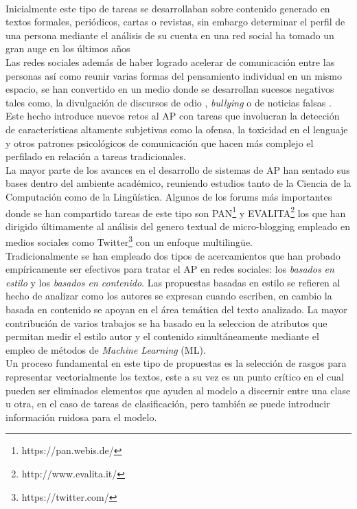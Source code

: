 \\
Inicialmente este tipo de tareas se desarrollaban sobre contenido generado en textos formales, periódicos, cartas o revistas, sin embargo determinar el perfil de una persona mediante el análisis de su cuenta en una red social ha tomado un gran auge en los últimos años \citep{rangel:2018,rangel:2019,f6032ffbacb14369b7a45d1ba9bd0b8c}
\\
 Las redes sociales además de haber logrado acelerar de comunicación entre las personas así como reunir varias formas del pensamiento individual en un mismo espacio, se han convertido en un medio donde se desarrollan sucesos negativos tales como, la divulgación de discursos de odio \citep{}, \textit{bullying} o de noticias falsas \citep{rangel:2020}. Este hecho introduce nuevos retos al AP con tareas que involucran la detección de características altamente subjetivas como la ofensa, la toxicidad en el lenguaje y otros patrones psicológicos de comunicación que hacen más complejo el perfilado en relación a tareas tradicionales.  
\\
 La mayor parte de los avances en el desarrollo de sistemas de AP han sentado sus bases dentro del ambiente académico, reuniendo estudios tanto de la Ciencia de la Computación como de la Lingüística. Algunos de los forums más importantes donde se han compartido tareas de este tipo son PAN\footnote{https://pan.webis.de/} y EVALITA\footnote{http://www.evalita.it/} los que han dirigido últimamente al análisis del genero textual de micro-blogging empleado en medios sociales como Twitter\footnote{https://twitter.com/} con un enfoque multilingüe.
\\
Tradicionalmente se han empleado dos tipos de acercamientos que han probado empíricamente ser efectivos para tratar el AP en redes sociales: los \textit{basados en estilo}  y los \textit{basados en contenido}. Las propuestas basadas en estilo se refieren al hecho de analizar como los autores se expresan cuando escriben, en cambio la basada en contenido se apoyan en el área temática del texto analizado. La mayor contribución de varios trabajos se ha basado en la seleccion de atributos que permitan medir el estilo autor y el contenido simultáneamente mediante el empleo de métodos de \textit{Machine Learning} (ML).
\\
Un proceso fundamental en este tipo de propuestas es la selección de rasgos para representar vectorialmente los textos, este a su vez es un punto crítico en el cual pueden ser eliminados elementos que ayuden al modelo a discernir entre una clase u otra, en el caso de tareas de clasificación, pero también se puede introducir información ruidosa para el modelo. 

